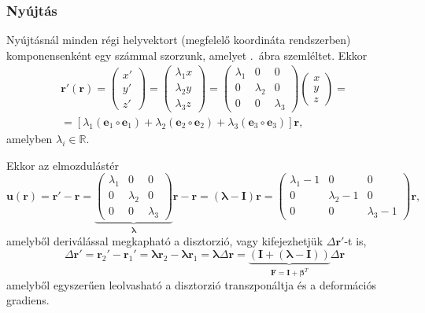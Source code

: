 \documentclass[12pt,a4paper]{scrartcl}
\let\mathbf\bm
\begin{document}
\subsubsection{Nyújtás}
Nyújtásnál minden régi helyvektort (megfelelő koordináta rendszerben) komponensenként egy számmal szorzunk, amelyet \az{\ref{fig:nyujtas}}.\ ábra szemléltet. Ekkor
\begin{multline*}
{\mathbf{r}}'\left( {\mathbf{r}} \right) = \left( {\begin{array}{*{20}{c}}
  {x'} \\ 
  {y'} \\ 
  {z'} 
\end{array}} \right) = \left( {\begin{array}{*{20}{c}}
  {{\lambda _1}x} \\ 
  {{\lambda _2}y} \\ 
  {{\lambda _3}z} 
\end{array}} \right) = \left( {\begin{array}{*{20}{c}}
  {{\lambda _1}}&0&0 \\ 
  0&{{\lambda _2}}&0 \\ 
  0&0&{{\lambda _3}} 
\end{array}} \right)\left( {\begin{array}{*{20}{c}}
  x \\ 
  y \\ 
  z 
\end{array}} \right) = \\ = \left[ {{\lambda _1}\left( {{{\mathbf{e}}_1} \circ {{\mathbf{e}}_1}} \right) + {\lambda _2}\left( {{{\mathbf{e}}_2} \circ {{\mathbf{e}}_2}} \right) + {\lambda _3}\left( {{{\mathbf{e}}_3} \circ {{\mathbf{e}}_3}} \right)} \right]{\mathbf{r}},
\end{multline*}
amelyben ${\lambda _i} \in \mathbb{R}$.

Ekkor az elmozdulástér
\[{\mathbf{u}}\left( {\mathbf{r}} \right) = {\mathbf{r}}' - {\mathbf{r}} = \underbrace {\left( {\begin{array}{*{20}{c}}
  {{\lambda _1}}&0&0 \\ 
  0&{{\lambda _2}}&0 \\ 
  0&0&{{\lambda _3}} 
\end{array}} \right)}_{\mathbf{\lambda }}{\mathbf{r}} - {\mathbf{r}} = \left( {{\mathbf{\lambda }} - {\mathbf{I}}} \right){\mathbf{r}} = \left( {\begin{array}{*{20}{c}}
  {{\lambda _1} - 1}&0&0 \\ 
  0&{{\lambda _2} - 1}&0 \\ 
  0&0&{{\lambda _3} - 1} 
\end{array}} \right){\mathbf{r}},\]
amelyből deriválással megkapható a disztorzió, vagy kifejezhetjük $\Delta {\mathbf{r}}'$-t is,
\[\Delta {\mathbf{r}}' = {{\mathbf{r}}_2}' - {{\mathbf{r}}_1}' = {\mathbf{\lambda }}{{\mathbf{r}}_2} - {\mathbf{\lambda }}{{\mathbf{r}}_1} = {\mathbf{\lambda }}\Delta {\mathbf{r}} = \underbrace {\left( {{\mathbf{I}} + \left( {{\mathbf{\lambda }} - {\mathbf{I}}} \right)} \right)}_{{\mathbf{F}} = {\mathbf{I}} + {{\mathbf{\beta }}^T}}\Delta {\mathbf{r}}\]
amelyből egyszerűen leolvasható a disztorzió transzponáltja és a deformációs gradiens.
\end{document}
